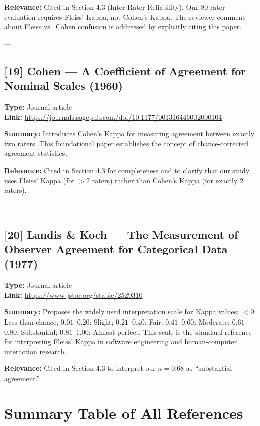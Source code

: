 \documentclass[11pt]{article}
\begin{document}
\textbf{Relevance:} Cited in Section 4.3 (Inter-Rater Reliability). Our 80-rater evaluation requires Fleiss' Kappa, not Cohen's Kappa. The reviewer comment about Fleiss vs.\ Cohen confusion is addressed by explicitly citing this paper.

---

\subsection*{[19] Cohen — A Coefficient of Agreement for Nominal Scales (1960)}
\textbf{Type:} Journal article \\
\textbf{Link:} \url{https://journals.sagepub.com/doi/10.1177/001316446002000104}

\textbf{Summary:} Introduces Cohen's Kappa for measuring agreement between exactly two raters. This foundational paper establishes the concept of chance-corrected agreement statistics.

\textbf{Relevance:} Cited in Section 4.3 for completeness and to clarify that our study uses Fleiss' Kappa (for $>2$ raters) rather than Cohen's Kappa (for exactly 2 raters).

---

\subsection*{[20] Landis \& Koch — The Measurement of Observer Agreement for Categorical Data (1977)}
\textbf{Type:} Journal article \\
\textbf{Link:} \url{https://www.jstor.org/stable/2529310}

\textbf{Summary:} Proposes the widely used interpretation scale for Kappa values: $<0$: Less than chance; $0.01$--$0.20$: Slight; $0.21$--$0.40$: Fair; $0.41$--$0.60$: Moderate; $0.61$--$0.80$: Substantial; $0.81$--$1.00$: Almost perfect. This scale is the standard reference for interpreting Fleiss' Kappa in software engineering and human-computer interaction research.

\textbf{Relevance:} Cited in Section 4.3 to interpret our $\kappa=0.68$ as ``substantial agreement.''

\section{Summary Table of All References}
\end{document}
